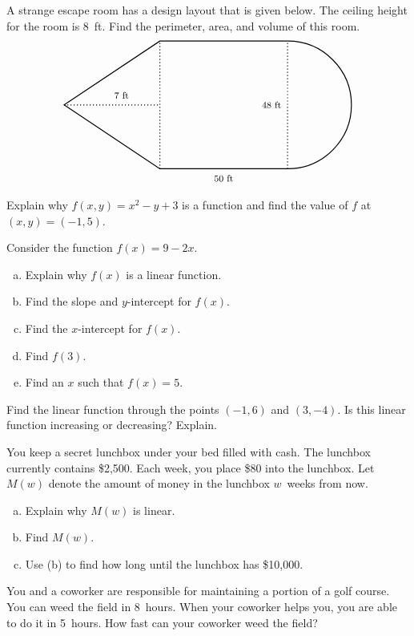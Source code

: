 \documentclass[12pt,letterpaper]{exam}
\begin{document}
\begin{questions}
\newpage
\question[10] A strange escape room has a design layout that is given below. The ceiling height for the room is 8~ft. Find the perimeter, area, and volume of this room.
	\[
	\begin{tikzpicture}
	\draw[line width=0.03cm] (4,-2) -- (0,-2) -- (-3,0) -- (0,2) -- (4,2);
	\draw[line width=0.03cm] (4,-2) arc(-90:90:2);
	
	\draw[line width=0.03cm,dotted] (-3,0) -- (0,0);
	\draw[line width=0.03cm,dotted] (0,-2) -- (0,2);
	\draw[line width=0.03cm,dotted] (4,-2) -- (4,2);
	
	\node at (-1.2,0.3) {\footnotesize 7~ft};
	\node at (2,-2.3) {\footnotesize 50~ft};
	\node at (3.5,0) {\footnotesize 48~ft};
	\end{tikzpicture}
	\]   



\newpage
\question[10] Explain why $f(x, y)= x^2 - y + 3$ is a function and find the value of $f$ at $(x, y)= (-1, 5)$. 



\newpage
\question[10] Consider the function $f(x)= 9 - 2x$. 
	\begin{enumerate}[(a)]
	\item Explain why $f(x)$ is a linear function. 
	\item Find the slope and $y$-intercept for $f(x)$. 
	\item Find the $x$-intercept for $f(x)$. 
	\item Find $f(3)$. 
	\item Find an $x$ such that $f(x)= 5$. 
	\end{enumerate}
	


\newpage
\question[10] Find the linear function through the points $(-1, 6)$ and $(3, -4)$. Is this linear function increasing or decreasing? Explain. 



\newpage
\question[10] You keep a secret lunchbox under your bed filled with cash. The lunchbox currently contains \$2,500. Each week, you place \$80 into the lunchbox. Let $M(w)$ denote the amount of money in the lunchbox $w$~weeks from now. 
	\begin{enumerate}[(a)]
	\item Explain why $M(w)$ is linear.
	\item Find $M(w)$. 
	\item Use (b) to find how long until the lunchbox has \$10,000. 
	\end{enumerate}



\newpage
\question[10] You and a coworker are responsible for maintaining a portion of a golf course. You can weed the field in 8~hours. When your coworker helps you, you are able to do it in 5~hours. How fast can your coworker weed the field?


\end{questions}
\end{document}
